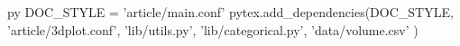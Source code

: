 
\begin{pythontexcustomcode}[begin]{py}
    DOC_STYLE = 'article/main.conf'
    pytex.add_dependencies(DOC_STYLE,
    'article/3dplot.conf',
    'lib/utils.py',
    'lib/categorical.py',
    'data/volume.csv'
    )
\end{pythontexcustomcode}


\setlength{\columnsep}{7mm}

\newcommand{\niceus}{\texttt{\_}}

\usepackage[
backend=biber,
style=ieee,
citestyle=numeric
]{biblatex}

